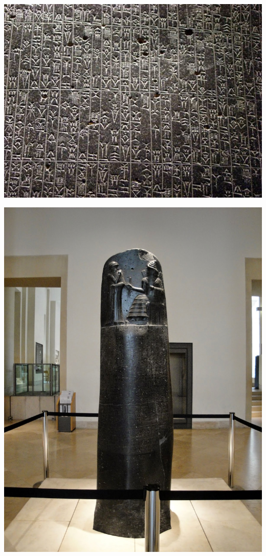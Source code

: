 \begin{multicols}{2}
	\begin{center}
	\includegraphics[width=\linewidth]{./IMG/codigo-de-hamurabi.jpg}
\end{center}	
	\vfill
	\columnbreak
	
	\begin{center}
		\includegraphics[height=.8\textheight]{./IMG/codigo de hamurabi.JPG}
	\end{center}


\end{multicols}
